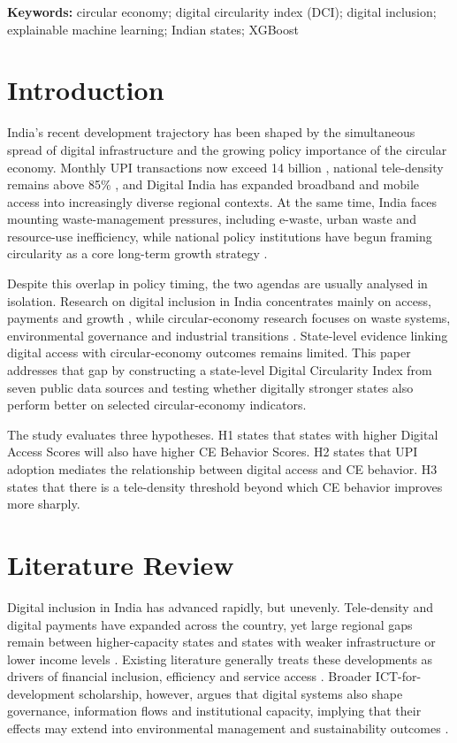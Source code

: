 \documentclass[10pt,a4paper]{article}
\begin{document}
\textbf{Keywords:} circular economy; digital circularity index (DCI); digital inclusion; explainable machine learning; Indian states; XGBoost

\section{Introduction}

India's recent development trajectory has been shaped by the simultaneous spread of digital infrastructure and the growing policy importance of the circular economy. Monthly UPI transactions now exceed 14 billion \citep{npci2025}, national tele-density remains above 85\% \citep{trai2024}, and Digital India has expanded broadband and mobile access into increasingly diverse regional contexts. At the same time, India faces mounting waste-management pressures, including e-waste, urban waste and resource-use inefficiency, while national policy institutions have begun framing circularity as a core long-term growth strategy \citep{cpcb2023,nitiCE2021}.

Despite this overlap in policy timing, the two agendas are usually analysed in isolation. Research on digital inclusion in India concentrates mainly on access, payments and growth \citep{meity2023}, while circular-economy research focuses on waste systems, environmental governance and industrial transitions \citep{geissdoerfer2017}. State-level evidence linking digital access with circular-economy outcomes remains limited. This paper addresses that gap by constructing a state-level Digital Circularity Index from seven public data sources and testing whether digitally stronger states also perform better on selected circular-economy indicators.

The study evaluates three hypotheses. H1 states that states with higher Digital Access Scores will also have higher CE Behavior Scores. H2 states that UPI adoption mediates the relationship between digital access and CE behavior. H3 states that there is a tele-density threshold beyond which CE behavior improves more sharply.

\section{Literature Review}

Digital inclusion in India has advanced rapidly, but unevenly. Tele-density and digital payments have expanded across the country, yet large regional gaps remain between higher-capacity states and states with weaker infrastructure or lower income levels \citep{trai2024,npci2025}. Existing literature generally treats these developments as drivers of financial inclusion, efficiency and service access \citep{meity2023}. Broader ICT-for-development scholarship, however, argues that digital systems also shape governance, information flows and institutional capacity, implying that their effects may extend into environmental management and sustainability outcomes \citep{avgerou2010,heeks2017}.
\end{document}
